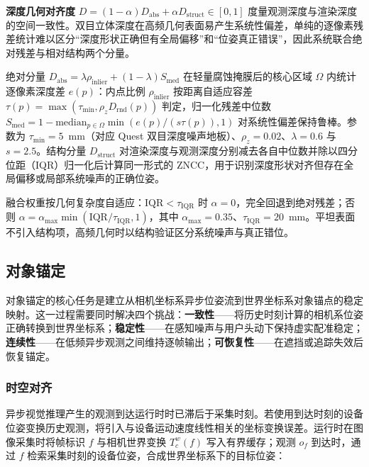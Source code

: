 \documentclass[review]{vgtc}
\begin{document}
\textbf{深度几何对齐度} $D = (1-\alpha) D_{\mathrm{abs}} + \alpha D_{\mathrm{struct}} \in [0,1]$ 度量观测深度与渲染深度的空间一致性。双目立体深度在高频几何表面易产生系统性偏差，单纯的逐像素残差统计难以区分“深度形状正确但有全局偏移”和“位姿真正错误”，因此系统联合绝对残差与相对结构两个分量。

绝对分量 $D_{\mathrm{abs}} = \lambda \rho_{\mathrm{inlier}} + (1-\lambda) S_{\mathrm{med}}$ 在轻量腐蚀掩膜后的核心区域 $\Omega$ 内统计逐像素深度差 $e(p)$：内点比例 $\rho_{\mathrm{inlier}}$ 按距离自适应容差 $\tau(p) = \max(\tau_{\mathrm{min}}, \rho_z D_{\mathrm{rnd}}(p))$ 判定，归一化残差中位数 $S_{\mathrm{med}} = 1 - \mathrm{median}_{p \in \Omega} \min(e(p)/(s\tau(p)), 1)$ 对系统性偏差保持鲁棒。参数为 $\tau_{\mathrm{min}} = 5$~mm（对应 Quest 双目深度噪声地板）、$\rho_z = 0.02$、$\lambda = 0.6$ 与 $s = 2.5$。结构分量 $D_{\mathrm{struct}}$ 对渲染深度与观测深度分别减去各自中位数并除以四分位距（IQR）归一化后计算同一形式的 ZNCC，用于识别深度形状对齐但存在全局偏移或局部系统噪声的正确位姿。

融合权重按几何复杂度自适应：$\mathrm{IQR} < \tau_{\mathrm{IQR}}$ 时 $\alpha = 0$，完全回退到绝对残差；否则 $\alpha = \alpha_{\mathrm{max}} \min(\mathrm{IQR}/\tau_{\mathrm{IQR}}, 1)$，其中 $\alpha_{\mathrm{max}} = 0.35$、$\tau_{\mathrm{IQR}} = 20$~mm。平坦表面不引入结构项，高频几何时以结构验证区分系统噪声与真正错位。

\subsection{对象锚定}\label{sec:anchoring}


对象锚定的核心任务是建立从相机坐标系异步位姿流到世界坐标系对象锚点的稳定映射。这一过程需要同时解决四个挑战：\textbf{一致性}------将历史时刻计算的相机系位姿正确转换到世界坐标系；\textbf{稳定性}------在感知噪声与用户头动下保持虚实配准稳定；\textbf{连续性}------在低频异步观测之间维持逐帧输出；\textbf{可恢复性}------在遮挡或追踪失效后恢复锚定。

\subsubsection{时空对齐}\label{sec:alignment}


异步视觉推理产生的观测到达运行时时已滞后于采集时刻。若使用到达时刻的设备位姿变换历史观测，将引入与设备运动速度线性相关的坐标变换误差。运行时在图像采集时将帧标识 $f$ 与相机世界变换 $T_c^w(f)$ 写入有界缓存；观测 $o_f$ 到达时，通过 $f$ 检索采集时刻的设备位姿，合成世界坐标系下的目标位姿：
\end{document}
